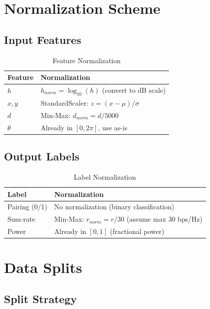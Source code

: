 \section{Normalization Scheme}

\subsection{Input Features}

\begin{table}[H]
\centering
\begin{tabular}{ll}
\toprule
\textbf{Feature} & \textbf{Normalization} \\
\midrule
$h$ & $h_{norm} = \log_{10}(h)$ (convert to dB scale) \\
$x, y$ & StandardScaler: $z = (x - \mu) / \sigma$ \\
$d$ & Min-Max: $d_{norm} = d / 5000$ \\
$\theta$ & Already in $[0, 2\pi]$, use as-is \\
\bottomrule
\end{tabular}
\caption{Feature Normalization}
\end{table}

\subsection{Output Labels}

\begin{table}[H]
\centering
\begin{tabular}{ll}
\toprule
\textbf{Label} & \textbf{Normalization} \\
\midrule
Pairing (0/1) & No normalization (binary classification) \\
Sum-rate & Min-Max: $r_{norm} = r / 30$ (assume max 30 bps/Hz) \\
Power & Already in $[0, 1]$ (fractional power) \\
\bottomrule
\end{tabular}
\caption{Label Normalization}
\end{table}

\section{Data Splits}

\subsection{Split Strategy}

